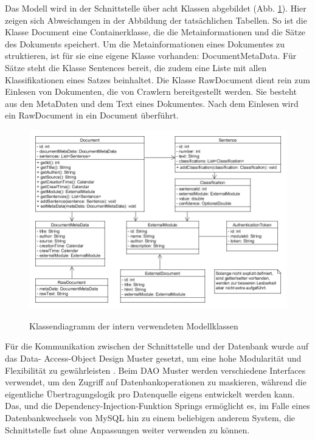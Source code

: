 Das Modell wird in der Schnittstelle über acht Klassen abgebildet (Abb. \ref{uml_model}).
Hier zeigen sich Abweichungen in der Abbildung der tatsächlichen Tabellen. So ist die
Klasse Document eine Containerklasse, die die Metainformationen und die Sätze des
Dokuments speichert. Um die Metainformationen eines Dokumentes zu struktieren, ist für
sie eine eigene Klasse vorhanden: DocumentMetaData. Für Sätze steht die Klasse Sentences
bereit, die zudem eine Liste mit allen Klassifikationen eines Satzes beinhaltet. Die 
Klasse RawDocument dient rein zum Einlesen von Dokumenten, die von Crawlern bereitgestellt
werden. Sie besteht aus den MetaDaten und dem Text eines Dokumentes. Nach dem Einlesen
wird ein RawDocument in ein Document überführt.

\begin{figure}[h]
	\centering
	\includegraphics[scale=0.5]{content/uml-model.png}
	\label{uml_model}
	\caption{Klassendiagramm der intern verwendeten Modellklassen}
\end{figure}

Für die Kommunikation zwischen der Schnittstelle und der Datenbank wurde auf das Data-
Access-Object Design Muster gesetzt, um eine hohe Modularität und Flexibilität zu
gewährleisten \cite{dao-pattern}. Beim DAO Muster werden verschiedene Interfaces
verwendet, um den Zugriff auf Datenbankoperationen zu maskieren, während die eigentliche
Übertragungslogik pro Datenquelle eigens entwickelt werden kann. Das, und die
Dependency-Injection-Funktion Springs ermöglicht es, im Falle eines Datenbankwechsels von
MySQL hin zu einem beliebigen anderem System, die Schnittstelle fast ohne Anpassungen
weiter verwenden zu können.

